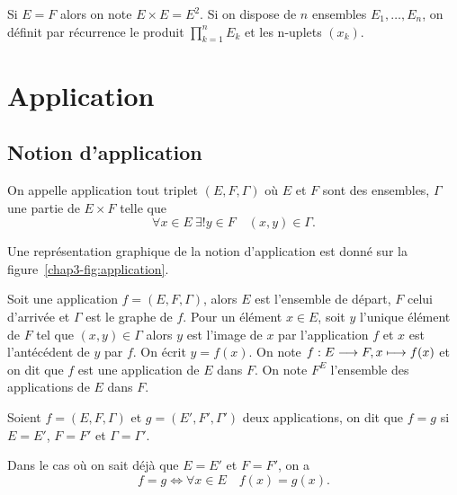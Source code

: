 Si \(E = F\) alors on note \(E \times E = E^2\). Si on dispose de \(n\) ensembles 
\(E_1, \ldots, E_n\), on définit par récurrence le produit \(\prod_{k = 1}^n E_k\) 
et les n-uplets \((x_k)\).

\section{Application}
\label{chap3-sec:applications}

\subsection{Notion d'application}
\label{chap3-subsec:notiondapplication}

\begin{defdef}
  On appelle application tout triplet \((E, F, \Gamma)\) où \(E\) et \(F\) sont 
  des ensembles, \(\Gamma\) une partie de \(E \times F\) telle que
  \begin{equation}
    \forall x \in E \ \exists! y \in F \quad (x,y) \in \Gamma.
  \end{equation}
\end{defdef}

Une représentation graphique de la notion d'application est donné sur la 
figure~\ref{chap3-fig:application}. 

Soit une application \(f = (E,F,\Gamma)\), alors \(E\) est l'ensemble de départ, 
\(F\) celui d'arrivée et \(\Gamma\) est le graphe de \(f\).
Pour un élément \(x \in E\), soit \(y\) l'unique élément de \(F\) tel que 
\((x,y) \in \Gamma\) alors \(y\) est l'image de \(x\) par l'application \(f\) et 
\(x\) est l'antécédent de \(y\) par \(f\). On écrit \(y = f(x)\). On note 
\(f:E \longrightarrow{} F, x \longmapsto{} f(x)\) et on dit que \(f\) est une application de 
\(E\) dans \(F\). On note \(F^E\) l'ensemble des applications de \(E\) dans 
\(F\).

\begin{defdef}
  Soient \(f = (E, F, \Gamma)\) et \(g = (E', F', \Gamma')\) deux applications, on 
  dit que \(f = g\) si \(E = E'\), \(F = F'\) et \(\Gamma = \Gamma'\).
\end{defdef}
Dans le cas où on sait déjà que \(E = E'\) et \(F = F'\), on a
\begin{equation}
  f = g \iff \forall x \in E \quad f(x) = g(x).
\end{equation}

